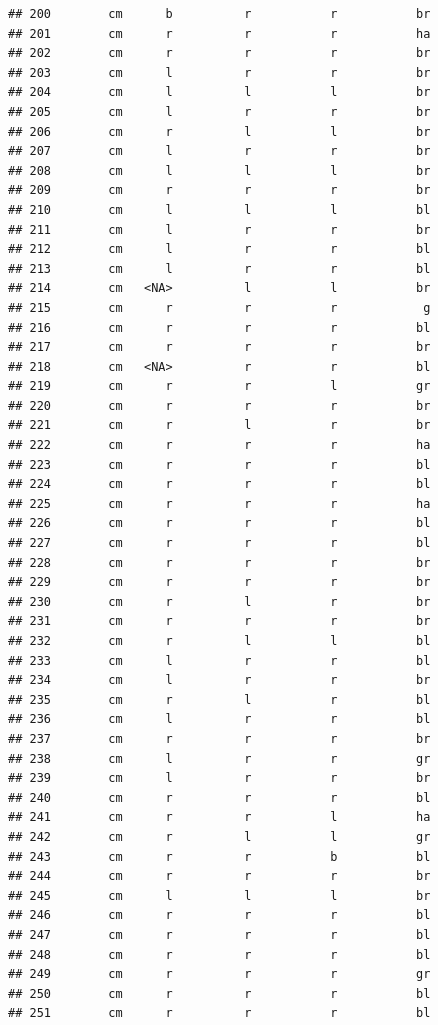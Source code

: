\documentclass[]{article}
\begin{document}
\begin{verbatim}
## 200        cm      b          r           r           br
## 201        cm      r          r           r           ha
## 202        cm      r          r           r           br
## 203        cm      l          r           r           br
## 204        cm      l          l           l           br
## 205        cm      l          r           r           br
## 206        cm      r          l           l           br
## 207        cm      l          r           r           br
## 208        cm      l          l           l           br
## 209        cm      r          r           r           br
## 210        cm      l          l           l           bl
## 211        cm      l          r           r           br
## 212        cm      l          r           r           bl
## 213        cm      l          r           r           bl
## 214        cm   <NA>          l           l           br
## 215        cm      r          r           r            g
## 216        cm      r          r           r           bl
## 217        cm      r          r           r           br
## 218        cm   <NA>          r           r           bl
## 219        cm      r          r           l           gr
## 220        cm      r          r           r           br
## 221        cm      r          l           r           br
## 222        cm      r          r           r           ha
## 223        cm      r          r           r           bl
## 224        cm      r          r           r           bl
## 225        cm      r          r           r           ha
## 226        cm      r          r           r           bl
## 227        cm      r          r           r           bl
## 228        cm      r          r           r           br
## 229        cm      r          r           r           br
## 230        cm      r          l           r           br
## 231        cm      r          r           r           br
## 232        cm      r          l           l           bl
## 233        cm      l          r           r           bl
## 234        cm      l          r           r           br
## 235        cm      r          l           r           bl
## 236        cm      l          r           r           bl
## 237        cm      r          r           r           br
## 238        cm      l          r           r           gr
## 239        cm      l          r           r           br
## 240        cm      r          r           r           bl
## 241        cm      r          r           l           ha
## 242        cm      r          l           l           gr
## 243        cm      r          r           b           bl
## 244        cm      r          r           r           br
## 245        cm      l          l           l           br
## 246        cm      r          r           r           bl
## 247        cm      r          r           r           bl
## 248        cm      r          r           r           bl
## 249        cm      r          r           r           gr
## 250        cm      r          r           r           bl
## 251        cm      r          r           r           bl
\end{verbatim}
\end{document}
